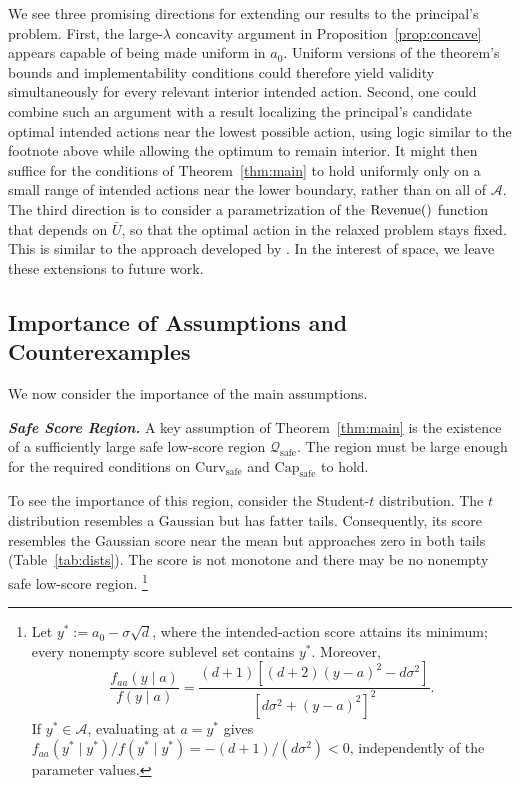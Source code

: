We see three promising directions for extending our results to the principal's problem. First, the large-$\lambda$ concavity argument in Proposition~\ref{prop:concave} appears capable of being made uniform in $a_0$. Uniform versions of the theorem's bounds and implementability conditions could therefore yield validity simultaneously for every relevant interior intended action. Second, one could combine such an argument with a result localizing the principal's candidate optimal intended actions near the lowest possible action, using logic similar to the footnote above while allowing the optimum to remain interior. It might then suffice for the conditions of Theorem~\ref{thm:main} to hold uniformly only on a small range of intended actions near the lower boundary, rather than on all of $\mathcal A$. The third direction is to consider a parametrization of the $\operatorname{Revenue} ()$ function that depends on $\bar U$, so that the optimal action in the relaxed problem stays fixed. This is similar to the approach developed by \textcite{chade2020highstakes}. In the interest of space, we leave these extensions to future work.



\subsection{Importance of Assumptions and Counterexamples}

We now consider the importance of the main assumptions.

\label{sec:counter-examples}
\medskip\noindent\textit{\textbf{Safe Score Region.}}
A key assumption of Theorem~\ref{thm:main} is the existence of a sufficiently large safe low-score region $\mathcal Q_{\mathrm{safe}}$.  The region must be large enough for the required conditions on $\mathrm{Curv}_{\mathrm{safe}}$ and $\mathrm{Cap}_{\mathrm{safe}}$ to hold.

To see the importance of this region, consider the Student-$t$ distribution.  The $t$ distribution resembles a Gaussian but has fatter tails.  Consequently, its score resembles the Gaussian score near the mean but approaches zero in both tails (Table~\ref{tab:dists}).  The score is not monotone and there may be no nonempty safe low-score region.%
\footnote{Let $y^*:=a_0-\sigma\sqrt{d}$, where the intended-action score attains its minimum; every nonempty score sublevel set contains $y^*$.  Moreover,
\[
 \frac{f_{aa}(y\mid a)}{f(y\mid a)}
 =\frac{(d+1)[(d+2)(y-a)^2-d\sigma^2]}
 {[d\sigma^2+(y-a)^2]^2}.
\]
If $y^*\in\mathcal A$, evaluating at $a=y^*$ gives
$f_{aa}(y^*\mid y^*)/f(y^*\mid y^*)=-(d+1)/(d\sigma^2)<0$, independently of the parameter values.}

